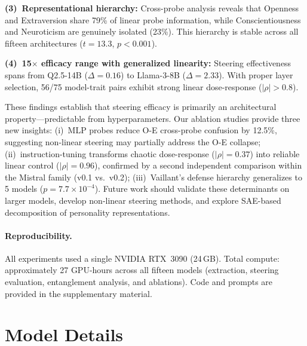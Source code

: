 \documentclass{article}
\begin{document}
\textbf{(3)~Representational hierarchy:} Cross-probe analysis reveals that Openness and Extraversion share 79\% of linear probe information, while Conscientiousness and Neuroticism are genuinely isolated (23\%). This hierarchy is stable across all fifteen architectures ($t{=}13.3$, $p{<}0.001$).

\textbf{(4)~15$\times$ efficacy range with generalized linearity:} Steering effectiveness spans from Q2.5-14B ($\Delta{=}0.16$) to Llama-3-8B ($\Delta{=}2.33$). With proper layer selection, 56/75 model-trait pairs exhibit strong linear dose-response ($|\rho|{>}0.8$).

These findings establish that steering efficacy is primarily an architectural property---predictable from hyperparameters. Our ablation studies provide three new insights: (i)~MLP probes reduce O-E cross-probe confusion by 12.5\%, suggesting non-linear steering may partially address the O-E collapse; (ii)~instruction-tuning transforms chaotic dose-response ($|\rho|{=}0.37$) into reliable linear control ($|\rho|{=}0.96$), confirmed by a second independent comparison within the Mistral family (v0.1 vs.\ v0.2); (iii)~Vaillant's defense hierarchy generalizes to 5 models ($p{=}7.7{\times}10^{-4}$). Future work should validate these determinants on larger models, develop non-linear steering methods, and explore SAE-based decomposition of personality representations.

\paragraph{Reproducibility.} All experiments used a single NVIDIA RTX~3090 (24\,GB). Total compute: approximately 27 GPU-hours across all fifteen models (extraction, steering evaluation, entanglement analysis, and ablations). Code and prompts are provided in the supplementary material.

{\small


}

\appendix

\section{Model Details}\label{app:model_details}
\end{document}
